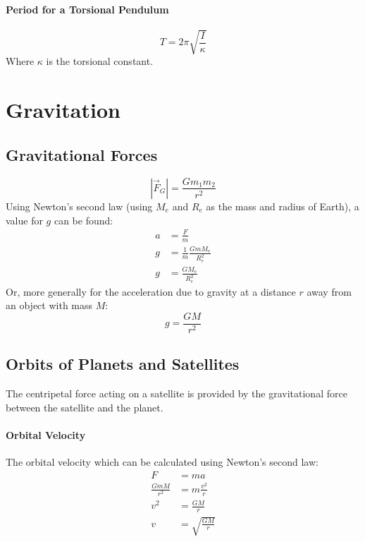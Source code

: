 \documentclass{article}
\begin{document}
            \paragraph{Period for a Torsional Pendulum}
            \begin{equation}
                T = 2 \pi \sqrt{\frac{I}{\kappa}}
            \end{equation}
            Where $\kappa$ is the torsional constant.

    \section{Gravitation}

        \subsection{Gravitational Forces}
            \begin{equation}
                \left| \vec{F}_G \right| = \frac{G m_1 m_2}{r^2}
            \end{equation}
            Using Newton's second law (using $M_e$ and $R_e$ as the mass and radius of Earth), a value for $g$ can be found:
            \begin{align}
                a &= \frac{F}{m} \nonumber\\
                g &= \frac{1}{m} \frac{G m M_e}{R_e^2} \nonumber\\
                g &= \frac{GM_e}{R_e^2}
            \end{align}
            Or, more generally for the acceleration due to gravity at a distance $r$ away from an object with mass $M$:
            \begin{equation}
                g = \frac{GM}{r^2}
            \end{equation}

        \subsection{Orbits of Planets and Satellites}
            The centripetal force acting on a satellite is provided by the gravitational force between the satellite and the planet.

            \paragraph{Orbital Velocity}
            The orbital velocity which can be calculated using Newton's second law:
            \begin{align}
                F &= m a \nonumber\\
                \frac{G m M}{r^2} &= m \frac{v^2}{r} \nonumber\\
                v^2 &= \frac{GM}{r} \nonumber\\
                v &= \sqrt{\frac{GM}{r}}
            \end{align}
\end{document}
